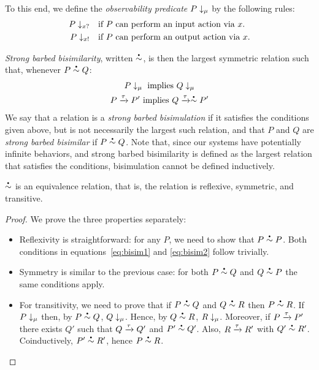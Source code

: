 To this end, we define the \emph{observability predicate} \( P\downarrow_{\mu} \) by the following rules:
\begin{align}
  P\downarrow_{x?}  &\quad \textrm{if \( P \) can perform an input action via \( x \).} \\
  P\downarrow_{x!} &\quad \textrm{if \( P \) can perform an output action via \( x \).}
\end{align}

\emph{Strong barbed bisimilarity}, written \( \sbbisim{}{} \), is then the largest symmetric relation such that, whenever \( \sbbisim{P}{Q} \):
\begin{gather}
  \observable{P}{\mu}~\textrm{implies}~\observable{Q}{\mu}\label{eq:bisim1} \\
  \transition{P}{\Atau}{P'}~\textrm{implies}~\transition{Q}{\Atau}{\sbbisim{}{} P'}\label{eq:bisim2}
\end{gather}
We say that a relation is a \emph{strong barbed bisimulation} if it satisfies the conditions given above, but is not necessarily the largest such relation, and that \( P \) and \( Q \) are \emph{strong barbed bisimilar} if \( \sbbisim{P}{Q} \).
Note that, since our systems have potentially infinite behaviors, and strong barbed bisimilarity is defined as the largest relation that satisfies the conditions, bisimulation cannot be defined inductively.

\begin{theorem}
  \( \sbbisim{}{} \) is an equivalence relation, that is, the relation is reflexive, symmetric, and transitive.
\end{theorem}
\begin{proof}
  We prove the three properties separately: 
  \begin{itemize}
  \item Reflexivity is straightforward: for any $P$, we need to show
    that $P\sbbisim{}{} P$. Both conditions in
    equations~\ref{eq:bisim1} and \ref{eq:bisim2} follow trivially.
  \item Symmetry is similar to the previous case: for both
    $P\sbbisim{}{} Q$ and $Q\sbbisim{}{} P$ the same conditions apply.
  \item For transitivity, we need to prove that if $P\sbbisim{}{} Q$
    and $Q\sbbisim{}{} R$ then $P\sbbisim{}{} R$. If
    $P\downarrow_{\mu}$ then, by $P\sbbisim{}{} Q$,
    $Q\downarrow_{\mu}$. Hence, by $Q\sbbisim{}{} R$,
    $R\downarrow_{\mu}$. Moreover, if $P \xrightarrow{\tau} P'$
    there exists $Q'$ such that $Q \xrightarrow{\tau} Q'$ and
    $P'\sbbisim{}{}Q'$. Also, $R \xrightarrow{\tau} R'$ with
    $Q'\sbbisim{}{}R'$. Coinductively, $P'\sbbisim{}{}R'$, hence
    $P\sbbisim{}{}R$.
  \end{itemize}
  
\end{proof}

